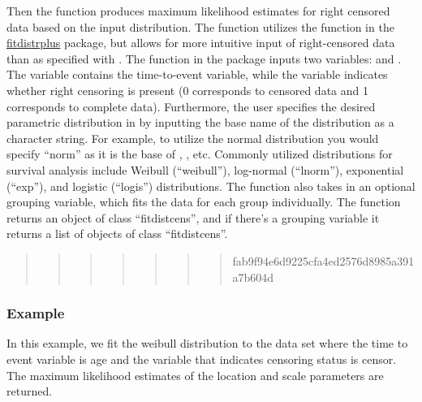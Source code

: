 Then the  function produces maximum likelihood estimates
for right censored data based on the input distribution. The
 function utilizes the  function in
the
\href{https://cran.r-project.org/web/packages/fitdistrplus/index.html}{fitdistrplus}
package, but allows for more intuitive input of right-censored data than
as specified with . The  function in
the  package inputs two variables:  and
. The  variable contains the time-to-event
variable, while the  variable indicates whether right
censoring is present (0 corresponds to censored data and 1 corresponds
to complete data). Furthermore, the user specifies the desired
parametric distribution in  by inputting the base name of the
distribution as a character string. For example, to utilize the normal
distribution you would specify ``norm'' as it is the base of
, , etc. Commonly utilized distributions for
survival analysis include Weibull (``weibull''), log-normal (``lnorm''),
exponential (``exp''), and logistic (``logis'') distributions. The
function also takes in an optional grouping variable, which fits the
data for each group individually. The function returns an object of
class ``fitdistcens'', and if there's a grouping variable it returns a
list of objects of class ``fitdistcens''.

\begin{quote}
\begin{quote}
\begin{quote}
\begin{quote}
\begin{quote}
\begin{quote}
\begin{quote}
fab9f94e6d9225cfa4ed2576d8985a391a7b604d
\end{quote}
\end{quote}
\end{quote}
\end{quote}
\end{quote}
\end{quote}
\end{quote}

\hypertarget{example}{%
\subsubsection{Example}\label{example}}

In this example, we fit the weibull distribution to the
 data set where the time to event variable is age and
the variable that indicates censoring status is censor. The maximum
likelihood estimates of the location and scale parameters are returned.

